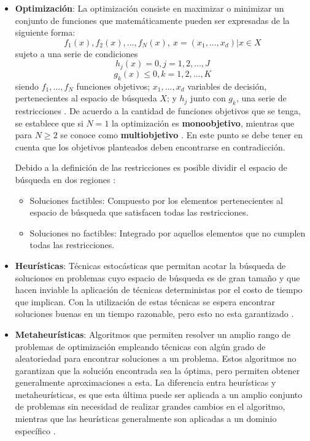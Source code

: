 \documentclass[11pt,letterpaper]{article}
\begin{document}
\begin{itemize}
\item \textbf{Optimización}: La optimización consiste en maximizar o minimizar un conjunto de funciones que matemáticamente pueden ser expresadas de la siguiente forma:
$$f_1(x),f_2(x), ..., f_N(x),\ x=(x_1,...,x_d) | x \in X$$
sujeto a una serie de condiciones
$$h_j(x) = 0, j=1,2,...,J$$
$$g_k(x) \leq 0, k=1,2,...,K$$
siendo $f_1,...,f_N$ funciones objetivos; $x_1, ..., x_d$ variables de decisión, pertenecientes al espacio de búsqueda $X$; y $h_j$ junto con $g_k$, una serie de restricciones \cite{Yang2015}. De acuerdo a la cantidad de funciones objetivos que se tenga, se establece que si $N=1$ la optimización es \textbf{monoobjetivo}, mientras que para $N\geq 2$ se conoce como \textbf{multiobjetivo} \cite{Yang2015}. En este punto se debe tener en cuenta que los objetivos planteados deben encontrarse en contradicción. 

Debido a la definición de las restricciones es posible dividir el espacio de búsqueda en dos regiones \cite{Bozorg-Haddad2017}:
\begin{itemize}
	\item Soluciones factibles: Compuesto por los elementos pertenecientes al espacio de búsqueda que satisfacen todas las restricciones.
	\item Soluciones no factibles: Integrado por aquellos elementos que no cumplen todas las restricciones.
\end{itemize}

\item \textbf{Heurísticas}: Técnicas estocásticas que permitan acotar la búsqueda de soluciones en problemas cuyo espacio de búsqueda es de gran tamaño y que hacen inviable la aplicación de técnicas deterministas por el costo de tiempo que implican. Con la utilización de estas técnicas se espera encontrar soluciones buenas en un tiempo razonable, pero esto no esta garantizado \cite{Yang2015,Romanycia1985}.


\item \textbf{Metaheurísticas}: Algoritmos que permiten resolver un amplio rango de problemas de optimización empleando técnicas con algún grado de aleatoriedad para encontrar soluciones a un problema. Estos algoritmos no garantizan que la solución encontrada sea la óptima, pero permiten obtener generalmente aproximaciones a esta. La diferencia entra heurísticas y metaheurísticas, es que esta última puede ser aplicada a un amplio conjunto de problemas sin necesidad de realizar grandes cambios en el algoritmo, mientras que las heurísticas generalmente son aplicadas a un dominio específico \cite{Yang2015,Boussaid2013,Luke2013}.


\end{itemize}
\end{document}

